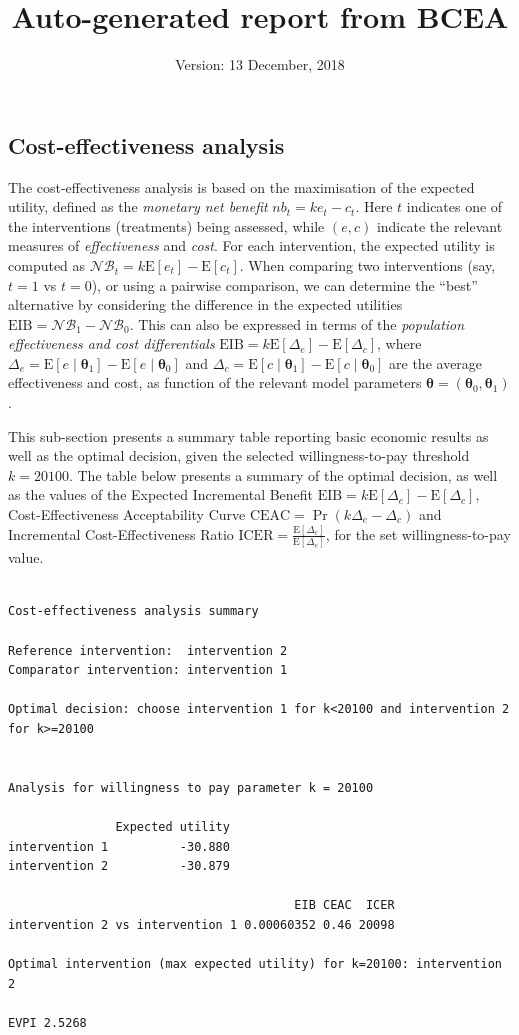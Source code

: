 \documentclass[]{article}
\title{Auto-generated report from BCEA}
\author{}
\date{Version: 13 December, 2018}
\begin{document}
\maketitle

\hypertarget{cost-effectiveness-analysis}{%
\subsection{Cost-effectiveness
analysis}\label{cost-effectiveness-analysis}}

The cost-effectiveness analysis is based on the maximisation of the
expected utility, defined as the \emph{monetary net benefit}
\(nb_t=ke_t-c_t\). Here \(t\) indicates one of the interventions
(treatments) being assessed, while \((e,c)\) indicate the relevant
measures of \emph{effectiveness} and \emph{cost}. For each intervention,
the expected utility is computed as
\(\mathcal{NB}_t=k\mbox{E}[e_t]-\mbox{E}[c_t]\). When comparing two
interventions (say, \(t=1\) vs \(t=0\)), or using a pairwise comparison,
we can determine the ``best'' alternative by considering the difference
in the expected utilities \(\mbox{EIB}=\mathcal{NB}_1-\mathcal{NB}_0\).
This can also be expressed in terms of the \emph{population
effectiveness and cost differentials}
\(\mbox{EIB}=k\mbox{E}[\Delta_e]-\mbox{E}[\Delta_c]\), where
\(\Delta_e=\mbox{E}[e\mid\bm\theta_1]-\mbox{E}[e\mid\bm\theta_0]\) and
\(\Delta_c=\mbox{E}[c\mid\bm\theta_1]-\mbox{E}[c\mid\bm\theta_0]\) are
the average effectiveness and cost, as function of the relevant model
parameters \(\bm\theta=(\bm\theta_0,\bm\theta_1)\).

This sub-section presents a summary table reporting basic economic
results as well as the optimal decision, given the selected
willingness-to-pay threshold \(k=20100\). The table below presents a
summary of the optimal decision, as well as the values of the Expected
Incremental Benefit
\(\mbox{EIB}=k\mbox{E}[\Delta_e]-\mbox{E}[\Delta_c]\),
Cost-Effectiveness Acceptability Curve
\(\mbox{CEAC}=\Pr(k\Delta_e-\Delta_c)\) and Incremental
Cost-Effectiveness Ratio
\(\mbox{ICER}=\displaystyle\frac{\mbox{E}[\Delta_c]}{\mbox{E}[\Delta_e]}\),
for the set willingness-to-pay value.

\begin{verbatim}

Cost-effectiveness analysis summary 

Reference intervention:  intervention 2
Comparator intervention: intervention 1

Optimal decision: choose intervention 1 for k<20100 and intervention 2 for k>=20100


Analysis for willingness to pay parameter k = 20100

               Expected utility
intervention 1          -30.880
intervention 2          -30.879

                                        EIB CEAC  ICER
intervention 2 vs intervention 1 0.00060352 0.46 20098

Optimal intervention (max expected utility) for k=20100: intervention 2
           
EVPI 2.5268
\end{verbatim}
\end{document}
